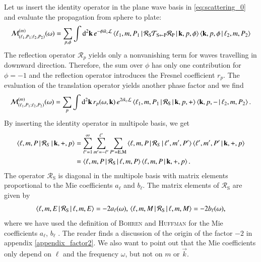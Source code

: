 Let us insert the identity operator in the plane wave basis in
\eqref{eq:scattering_0} and evaluate the propagation from sphere to
plate:
\begin{equation}
\mathcal{M}^{(m)}_{(\ell_1,P_1;\ell_2,P_2)}(\omega) = %
\sum_{p,\phi} \int \mathrm{d}^2 \vec k \, \e^{-\phi\imag k_z \mathcal{L}}\braket{\ell_1,m,P_1 \, | \, \mathcal{R}_\text{S} \mathcal{T}_{\text{S}\leftarrow\text{P}} \mathcal{R}_\text{P} \, | \, \vec k, p, \phi}\braket{\vec k, p, \phi \, | \, \ell_2,m,P_2} 
\end{equation}
The reflection operator $\mathcal{R}_p$ yields only a nonvanishing term
for waves travelling in downward direction. Therefore, the sum over $\phi$
has only one contribution for $\phi=-1$ and the reflection operator
introduces the Fresnel coefficient $r_p$. The evaluation of the
translation operator yields another phase factor and we find
\begin{equation}
\mathcal{M}_{(\ell_1,P_1;\ell_2,P_2)}^{(m)}(\omega) = \sum_{p} \int \mathrm{d}^2 {\mathbf{k}} \, r_p(\omega,{\mathbf{k}}) \, e^{2 i k_z \mathcal{L}}\braket{\ell_1,m,P_1 \, | \, \mathcal{R}_\text{S} \, | \, {\mathbf{k}}, p, +}\braket{{\mathbf{k}}, p, - \, | \, \ell_2,m,P_2}.
\end{equation}
By inserting the identity operator in multipole basis, we get
\begin{align}
\nonumber
\braket{\ell,m,P \, | \, \mathcal{R}_S \, | \, {\mathbf{k}},+,p} &= \sum_{\ell^\prime=1}^\infty \sum_{m^\prime=-\ell^\prime}^{\ell^\prime} \sum_{P^\prime=\text{E},\text{M}} \braket{\ell,m,P \, | \, \mathcal{R}_S \, | \, \ell^\prime,m^\prime,P^\prime} \braket{\ell^\prime,m^\prime,P^\prime \, | \, {\mathbf{k}},+,p} \\
&= \braket{\ell,m,P \, | \, \mathcal{R}_\text{S} \, | \, \ell,m,P} \braket{\ell,m,P \, | \, {\mathbf{k}},+,p}.
\end{align}
The operator $\mathcal{R}_\text{S}$ is diagonal in the multipole basis with
matrix elements proportional to the Mie coefficients $a_\ell$ and $b_\ell$. The
matrix elements of $\mathcal{R}_\text{S}$ are given by
\begin{equation}
\braket{\ell,m,E \, | \, \mathcal{R}_\text{S} \, | \, \ell,m,E} = -2 a_\ell(\omega), \\
\braket{\ell,m,M \, | \, \mathcal{R}_\text{S} \, | \, \ell,m,M} = -2 b_\ell(\omega),
\end{equation}
where we have used the definition of \textsc{Bohren} and \textsc{Huffman} 
for the Mie coefficients $a_\ell$, $b_\ell$ \cite{bohrenhuffman}.
The reader finds a discussion of the origin of the factor $-2$ in appendix \ref{appendix_factor2}.
We also want to point out that the Mie coefficients only depend on $\ell$ and the frequency
$\omega$, but not on $m$ or $\vec k$.


